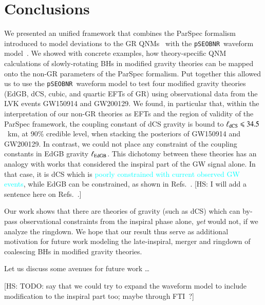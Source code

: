 \documentclass[twocolumn,
               prd,
               aps,
               superscriptaddress,
               tightenlines,
               nofootinbib,
               eqsecnum,
               amsfonts,
               amsmath,
               longbibliography]{revtex4-1}
\newcommand{\pSEOB}{\texttt{pSEOBNR}}
\newcommand{\hs}[1]{{\textcolor{TealBlue}{{#1}}}}
\newcommand{\hscomm}[1]{{\textcolor{TealBlue}{{[HS: #1]}}}}
\newcommand{\ab}[1]{{\textcolor{cyan}{{#1}}}}
\begin{document}
\section{Conclusions}
\label{sec:conclusions}


We presented an unified framework that combines the ParSpec formalism introduced
to model deviations to the GR QNMs~\cite{Maselli:2019mjd} with the \pSEOB~waveform model~\cite{Brito:2018rfr,Ghosh:2021mrv}.
%
We showed with concrete examples, how theory-specific QNM calculations of
slowly-rotating BHs in modified gravity theories can be mapped onto the
non-GR parameters of the ParSpec formalism.
%
Put together this allowed us to use the \pSEOB~waveform model to test four
modified gravity theories (EdGB, dCS, cubic, and quartic EFTs of GR) using
observational data from the LVK events GW150914 and GW200129.
%
We found, in particular that, within the interpretation of our non-GR theories as EFTs and the
region of validity of the ParSpec framework, the coupling constant of dCS gravity is bound to
$\ell_{\rm dCS} \leqslant 34.5$~km, at 90\% credible level, when stacking the posteriors
of GW150914 and GW200129.
%
In contrast, we could not place any constraint of the coupling constants in EdGB gravity $\ell_{\rm EdGB}$.
%
This dichotomy between these theories has an analogy with works that considered
the inspiral part of the GW signal alone.
%
In that case, it is dCS which is \ab{poorly constrained with current observed GW
events}, while EdGB can be constrained, as shown in Refs.~\cite{Nair:2019iur,Perkins:2021mhb,Lyu:2022gdr}.
%
\hscomm{I will add a sentence here on Refs.~\cite{Alexander:2017jmt,Loutrel:2018ydv,Loutrel:2018rxs}.}

Our work shows that there are theories of gravity (such as dCS) which can by-pass observational
constraints from the inspiral phase alone, {\it yet} would not, if we
analyze the ringdown.
%
We hope that our result thus serve as additional motivation for future work
modeling the late-inspiral, merger and ringdown of coalescing BHs in modified
gravity theories.

Let us discuss some avenues for future work \dots

\hscomm{TODO: say that we could try to expand the waveform model to include modification to
the inspiral part too; maybe through FTI~\cite{Mehta:2022pcn}?}
\end{document}
